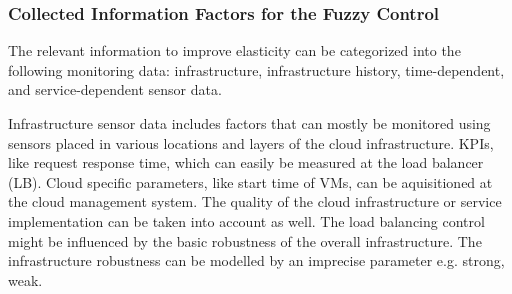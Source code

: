 \subsubsection{Collected Information Factors for the Fuzzy Control}\label{fuzzyParameters}
The relevant information to improve elasticity can be categorized into the following monitoring data: infrastructure, infrastructure history, time-dependent, and service-dependent sensor data. %


Infrastructure sensor data includes factors that can mostly be monitored using sensors placed in various locations and layers of the cloud infrastructure. KPIs, like request response time, which can easily be measured at the load balancer (LB). Cloud specific parameters, like start time of VMs, can be aquisitioned at the cloud management system. %
The quality of the cloud infrastructure or service implementation can be taken into account as well. The load balancing control might be influenced by the basic robustness of the overall infrastructure. The infrastructure robustness can be modelled by an imprecise parameter e.g. strong, weak. 

